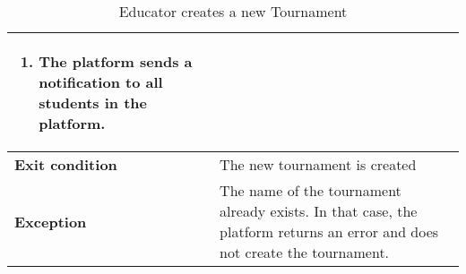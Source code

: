 \begin{enumerate}[label=\textbf{UC\arabic*}:,ref=UC\arabic*,leftmargin=1.3cm]
{\begin{table}[H]
\begin{tabular}{|l|p{11.9cm}|}
\begin{enumerate}[label=\arabic*.]
                              \item The platform sends a notification to all students in the platform.
                        \end{enumerate} \\\hline
                        \textbf{Exit condition}  & The new tournament is created                                                                     \\\hline
                        \textbf{Exception}       & The name of the tournament already exists.
                        In that case, the platform returns an error and does not create the tournament.                                              \\\hline
                  \end{tabular}
                  \caption{Educator creates a new Tournament }
                  \label{table:Educator creates a new Tournament }
            \end{table}
            \begin{adjustbox}{
                        max size={\textwidth}{},
                        caption={Educator creates a new Tournament},
                        label={fig:Educator creates a new Tournament},
                        figure=H}
                  \centering
            \end{adjustbox}
            \pagebreak
      }
\end{enumerate}

